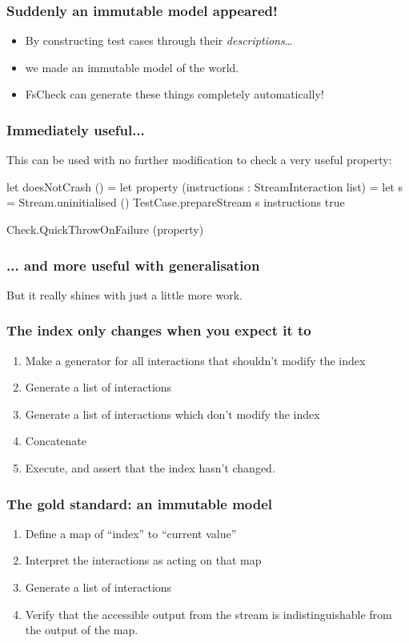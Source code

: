 \documentclass{beamer}
\begin{document}
\begin{frame}
\frametitle{Suddenly an immutable model appeared!}

\begin{itemize}
\item By constructing test cases through their \emph{descriptions}\dots
\item we made an immutable model of the world.
\item FsCheck can generate these things completely automatically!
\end{itemize}
\end{frame}

\begin{frame}[fragile]
\frametitle{Immediately useful...}
This can be used with no further modification to check a very useful property:

\begin{fslisting}
[<Test>]
let doesNotCrash () =
    let property (instructions : StreamInteraction list) =
        let s = Stream.uninitialised ()
        TestCase.prepareStream s instructions
        true

    Check.QuickThrowOnFailure (property)
\end{fslisting}
\end{frame}

\begin{frame}
\frametitle{... and more useful with generalisation}
But it really shines with just a little more work.
\end{frame}

\begin{frame}
\frametitle{The index only changes when you expect it to}
\begin{enumerate}
\item Make a generator for all interactions that shouldn't modify the index
\item Generate a list of interactions
\item Generate a list of interactions which don't modify the index
\item Concatenate
\item Execute, and assert that the index hasn't changed.
\end{enumerate}
\end{frame}

\begin{frame}
\frametitle{The gold standard: an immutable model}

\begin{enumerate}
\item Define a map of ``index'' to ``current value''
\item Interpret the interactions as acting on that map
\item Generate a list of interactions
\item Verify that the accessible output from the stream is indistinguishable from the output of the map.
\end{enumerate}
\end{frame}
\end{document}
